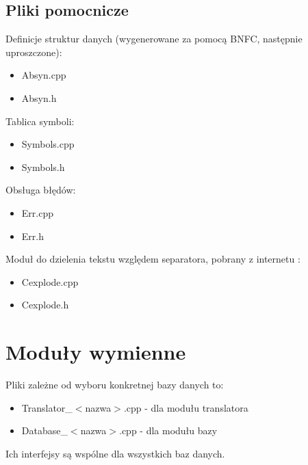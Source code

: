 \subsection{Pliki pomocnicze}
Definicje struktur danych (wygenerowane za pomocą BNFC, następnie uproszczone):
\begin{itemize}
 \item Absyn.cpp
\item Absyn.h
\end{itemize}
Tablica symboli:
\begin{itemize}
 \item Symbols.cpp
\item Symbols.h
\end{itemize}
Obsługa błędów:
\begin{itemize}
 \item Err.cpp
\item Err.h
\end{itemize}
Moduł do dzielenia tekstu względem separatora, pobrany z internetu \cite{cexplode}:
\begin{itemize}
 \item Cexplode.cpp
 \item Cexplode.h
\end{itemize}


\section{Moduły wymienne}
Pliki zależne od wyboru konkretnej bazy danych to:
\begin{itemize}
 \item Translator\_$<$nazwa$>$.cpp - dla modułu translatora
\item Database\_$<$nazwa$>$.cpp - dla modułu bazy
\end{itemize}
Ich interfejsy są wspólne dla wszystkich baz danych.
